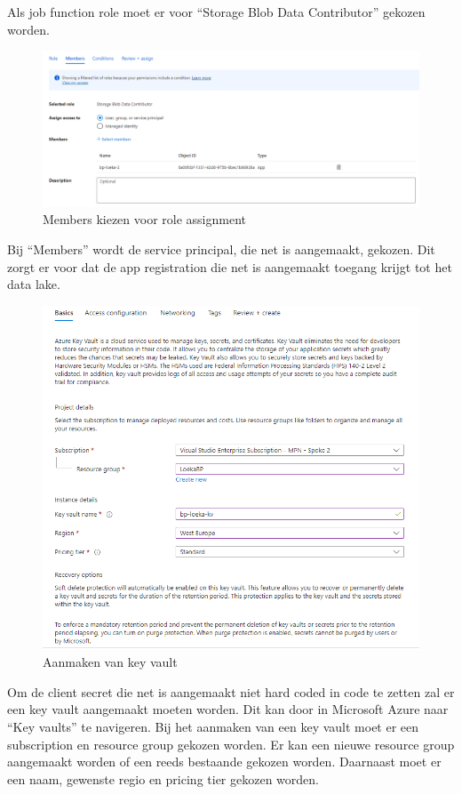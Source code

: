 Als job function role moet er voor ``Storage Blob Data Contributor'' gekozen worden.

\begin{figure}[H]
    \centering
    \includegraphics[width=1\textwidth]{./graphics/databricks/connection_6.png}
    \caption{Members kiezen voor role assignment}
\end{figure}

Bij ``Members'' wordt de service principal, die net is aangemaakt, gekozen. Dit zorgt er voor dat de app registration die net is aangemaakt toegang krijgt tot het data lake.

\begin{figure}[H]
    \centering
    \includegraphics[width=1\textwidth]{./graphics/databricks/connection_8.png}
    \caption{Aanmaken van key vault}
\end{figure}

Om de client secret die net is aangemaakt niet hard coded in code te zetten zal er een key vault aangemaakt moeten worden. Dit kan door in Microsoft Azure naar ``Key vaults'' te navigeren. Bij het aanmaken van een key vault moet er een subscription en resource group gekozen worden. Er kan een nieuwe resource group aangemaakt worden of een reeds bestaande gekozen worden. Daarnaast moet er een naam, gewenste regio en pricing tier gekozen worden.

